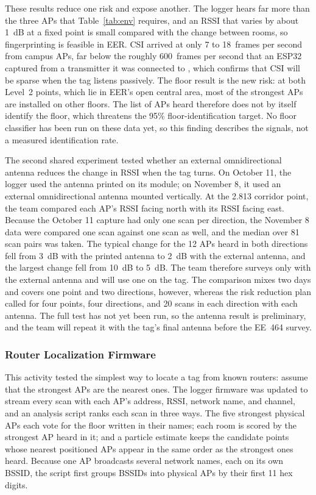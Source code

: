 \documentclass[12pt,letterpaper]{article}
\begin{document}
These results reduce one risk and expose another. The logger hears far more than the three APs that
Table~\ref{tab:env} requires, and an RSSI that varies by about 1~dB at a fixed point is small compared
with the change between rooms, so fingerprinting is feasible in EER. CSI arrived at only 7 to
18~frames per second from campus APs, far below the roughly 600~frames per second that an ESP32
captured from a transmitter it was connected to \cite{esp32tool}, which confirms that CSI will be
sparse when the tag listens passively. The floor result is the new risk: at both Level~2 points,
which lie in EER's open central area, most of the strongest APs are installed on other floors. The
list of APs heard therefore does not by itself identify the floor, which threatens the 95\%
floor-identification target. No floor classifier has been run on these data yet, so this finding
describes the signals, not a measured identification rate.

The second shared experiment tested whether an external omnidirectional antenna reduces the change in
RSSI when the tag turns. On October 11, the logger used the antenna printed on its module; on
November 8, it used an external omnidirectional antenna mounted vertically. At the 2.813
corridor point, the team compared each AP's RSSI facing north with its RSSI facing east. Because the
October 11 capture had only one scan per direction, the November 8 data were compared one scan
against one scan as well, and the median over 81 scan pairs was taken. The typical change for the 12
APs heard in both directions fell from 3~dB with the printed antenna to 2~dB with the external
antenna, and the largest change fell from 10~dB to 5~dB. The team therefore surveys only with the
external antenna and will use one on the tag. The comparison mixes two days and covers one point and
two directions, however, whereas the risk reduction plan called for four points, four directions,
and 20 scans in each direction with each antenna. The full test has not yet been run, so the
antenna result is preliminary, and the team will repeat it with the tag's final antenna before the
EE~464 survey.

\subsubsection{Router Localization Firmware}
This activity tested the simplest way to locate a tag from known routers: assume that the strongest
APs are the nearest ones. The logger firmware was updated to stream every scan with each AP's
address, RSSI, network name, and channel, and an analysis script ranks each scan in three ways. The
five strongest physical APs each vote for the floor written in their names; each room is scored by the
strongest AP heard in it; and a particle estimate keeps the candidate points whose nearest positioned
APs appear in the same order as the strongest ones heard. Because one AP broadcasts several network
names, each on its own BSSID, the script first groups BSSIDs into physical APs by their first 11 hex
digits.
\end{document}
